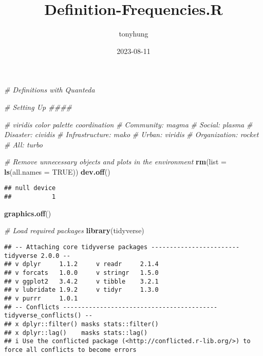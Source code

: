 \documentclass[
]{article}
\title{Definition-Frequencies.R}
\author{tonyhung}
\date{2023-08-11}
\newenvironment{Shaded}{\begin{snugshade}}{\end{snugshade}}
\newcommand{\AttributeTok}[1]{\textcolor[rgb]{0.13,0.29,0.53}{#1}}
\newcommand{\CommentTok}[1]{\textcolor[rgb]{0.56,0.35,0.01}{\textit{#1}}}
\newcommand{\ConstantTok}[1]{\textcolor[rgb]{0.56,0.35,0.01}{#1}}
\newcommand{\FunctionTok}[1]{\textcolor[rgb]{0.13,0.29,0.53}{\textbf{#1}}}
\newcommand{\NormalTok}[1]{#1}
\begin{document}
\maketitle

\begin{Shaded}
\begin{Highlighting}[]
\CommentTok{\# Definitions with Quanteda}

\CommentTok{\# Setting Up \#\#\#\#}

\CommentTok{\# viridis color palette coordination}
\CommentTok{\# Community: magma}
\CommentTok{\# Social: plasma}
\CommentTok{\# Disaster: cividis}
\CommentTok{\# Infrastructure: mako}
\CommentTok{\# Urban: viridis}
\CommentTok{\# Organization: rocket}
\CommentTok{\# All: turbo}

\CommentTok{\# Remove unnecessary objects and plots in the environment}
\FunctionTok{rm}\NormalTok{(}\AttributeTok{list =} \FunctionTok{ls}\NormalTok{(}\AttributeTok{all.names =} \ConstantTok{TRUE}\NormalTok{))}
\FunctionTok{dev.off}\NormalTok{()}
\end{Highlighting}
\end{Shaded}

\begin{verbatim}
## null device 
##           1
\end{verbatim}

\begin{Shaded}
\begin{Highlighting}[]
\FunctionTok{graphics.off}\NormalTok{()}

\CommentTok{\# Load required packages}
\FunctionTok{library}\NormalTok{(tidyverse)}
\end{Highlighting}
\end{Shaded}

\begin{verbatim}
## -- Attaching core tidyverse packages ------------------------ tidyverse 2.0.0 --
## v dplyr     1.1.2     v readr     2.1.4
## v forcats   1.0.0     v stringr   1.5.0
## v ggplot2   3.4.2     v tibble    3.2.1
## v lubridate 1.9.2     v tidyr     1.3.0
## v purrr     1.0.1     
## -- Conflicts ------------------------------------------ tidyverse_conflicts() --
## x dplyr::filter() masks stats::filter()
## x dplyr::lag()    masks stats::lag()
## i Use the conflicted package (<http://conflicted.r-lib.org/>) to force all conflicts to become errors
\end{verbatim}
\end{document}
